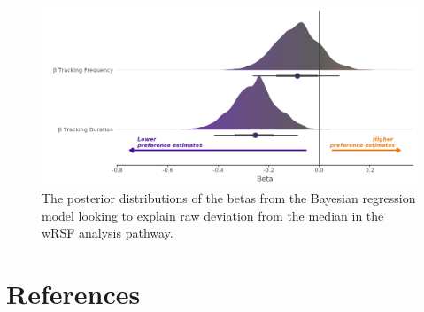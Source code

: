 \documentclass[10pt,a4paper]{article}
\begin{document}
\begin{figure}
\includegraphics[width=1\linewidth]{../figures/wrsf_rEstwrsf_effectsPlot} \caption{The posterior distributions of the betas from the Bayesian regression model looking to explain raw deviation from the median in the wRSF analysis pathway.}\label{fig:rEstBetasWRSF}
\end{figure}

\clearpage

\section*{References}\label{references}
\end{document}

